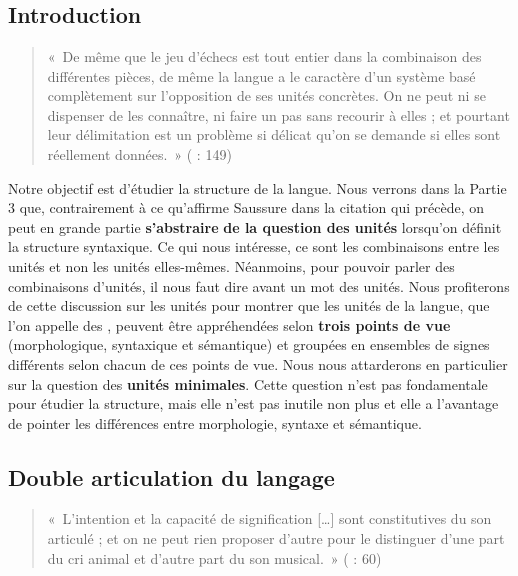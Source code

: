 \chapter{}\label{sec:2.1}

\section{Introduction}\label{sec:2.1.0}

\begin{quote}
    «~De même que le jeu d’échecs est tout entier dans la combinaison des différentes pièces, de même la langue a le caractère d’un système basé complètement sur l’opposition de ses unités concrètes. On ne peut ni se dispenser de les connaître, ni faire un pas sans recourir à elles ; et pourtant leur délimitation est un problème si délicat qu’on se demande si elles sont réellement données.~» (\citealt{Saussure1916} : 149)
\end{quote}

Notre objectif est d’étudier la structure de la langue. Nous verrons dans la Partie 3 que, contrairement à ce qu’affirme Saussure dans la citation qui précède, on peut en grande partie \textbf{s’abstraire} \textbf{de la question des unités} lorsqu’on définit la structure syntaxique. Ce qui nous intéresse, ce sont les combinaisons entre les unités et non les unités elles-mêmes. Néanmoins, pour pouvoir parler des combinaisons d’unités, il nous faut dire avant un mot des unités. Nous profiterons de cette discussion sur les unités pour montrer que les unités de la langue, que l’on appelle des , peuvent être appréhendées selon \textbf{trois points de vue} (morphologique, syntaxique et sémantique) et groupées en ensembles de signes différents selon chacun de ces points de vue. Nous nous attarderons en particulier sur la question des \textbf{unités minimales}. Cette question n’est pas fondamentale pour étudier la structure, mais elle n’est pas inutile non plus et elle a l’avantage de pointer les différences entre morphologie, syntaxe et sémantique.

\section{Double articulation du langage}\label{sec:2.1.1}

\begin{quote}
    «~L’intention et la capacité de signification […] sont constitutives du son articulé ; et on ne peut rien proposer d’autre pour le distinguer d’une part du cri animal et d’autre part du son musical.~» (\citealt{Humboldt1836} : 60)
\end{quote}

